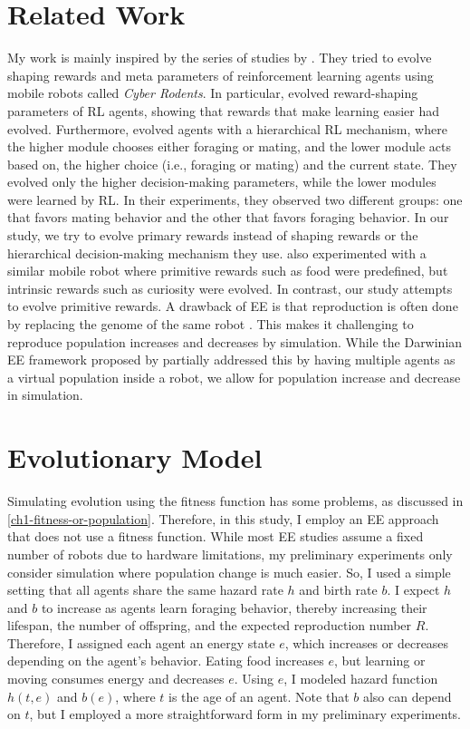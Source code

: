 \section{Related Work}
My work is mainly inspired by the series of studies by \citet{elfwingBiologicallyInspiredEmbodied2005,elfwing
  DarwinianEmbodiedEvolution2011a,elfwingEmergencePolymorphicMating2014}. They tried to evolve shaping rewards and meta parameters of reinforcement learning agents using mobile robots called \textit{Cyber Rodents}. In particular, \citet{elfwingDarwinianEmbodiedEvolution2011a} evolved reward-shaping parameters of RL agents, showing that rewards that make learning easier had evolved. Furthermore, \citet{elfwingEmergencePolymorphicMating2014} evolved agents with a hierarchical RL mechanism, where the higher module chooses either foraging or mating, and the lower module acts based on, the higher choice (i.e., foraging or mating) and the current state. They evolved only the higher decision-making parameters, while the lower modules were learned by RL\@. In their experiments, they observed two different groups: one that favors mating behavior and the other that favors foraging behavior. In our study, we try to evolve primary rewards instead of shaping rewards or the hierarchical decision-making mechanism they use. \citet{uchibeFindingIntrinsicRewards2008} also experimented with a similar mobile robot where primitive rewards such as food were predefined, but intrinsic rewards such as curiosity were evolved. In contrast, our study attempts to evolve primitive rewards. A drawback of EE is that reproduction is often done by replacing the genome of the same robot \citep{bredecheEmbodiedEvolutionCollective2018}. This makes it challenging to reproduce population increases and decreases by simulation. While the Darwinian EE framework proposed by \citet{elfwingDarwinianEmbodiedEvolution2011a} partially addressed this by having multiple agents as a virtual population inside a robot, we allow for population increase and decrease in simulation.

\section{Evolutionary Model}
Simulating evolution using the fitness function has some problems, as discussed in \cref{ch1-fitness-or-population}. Therefore, in this study, I employ an EE approach that does not use a fitness function. While most EE studies assume a fixed number of robots due to hardware limitations, my preliminary experiments only consider simulation where population change is much easier. So, I used a simple setting that all agents share the same hazard rate $h$ and birth rate $b$. I expect $h$ and $b$ to increase as agents learn foraging behavior, thereby increasing their lifespan, the number of offspring, and the expected reproduction number $R$. Therefore, I assigned each agent an energy state $e$, which increases or decreases depending on the agent's behavior. Eating food increases $e$, but learning or moving consumes energy and decreases $e$. Using $e$, I modeled hazard function $h (t,e)$ and $b (e)$, where $t$ is the age of an agent. Note that $b$ also can depend on $t$, but I employed a more straightforward form in my preliminary experiments.

